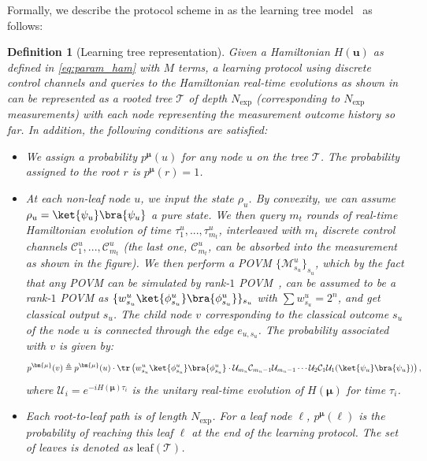 \documentclass[twocolumn,superscriptaddress,aps,showpacs,amsmath,amstex,amssymb,citeautoscript,floatfix,pra,preprintnumbers]{revtex4-2}
\theoremstyle{plain}
\theoremstyle{plain}
\theoremstyle{plain}
\theoremstyle{plain}
\theoremstyle{plain}
\theoremstyle{plain}
\newtheorem{defn}{Definition}
\begin{document}
\begin{appendix}
Formally, we describe the protocol scheme in  as the learning tree model~\cite{learningtree,OptimalTradeOff} as follows:
\begin{defn}[Learning tree representation] 
Given a Hamiltonian $H(\bm{u})$ as defined in \eqref{eq:param_ham} with $M$ terms, a learning protocol using discrete control channels and queries to the Hamiltonian real-time evolutions as shown in  can be represented as a rooted tree $\mathcal{T}$ of depth $N_{\exp}$ (corresponding to $N_{\exp}$ measurements) with each node representing the measurement outcome history so far. In addition, the following conditions are satisfied:
\begin{itemize}
    \item We assign a probability $p^{\bm{\mu}}(u)$ for any node $u$ on the tree $\mathcal{T}$. The probability assigned to the root $r$ is $p^{\bm{\mu}}(r)=1$.
    \item At each non-leaf node $u$, we input the state $\rho_u$. By convexity, we can assume $\rho_u=\ket{\psi_u}\bra{\psi_u}$ a pure state. We then query $m_t$ rounds of real-time Hamiltonian evolution of time $\tau^u_{1},...,\tau^u_{m_t}$, interleaved with $m_t$ discrete control channels $\mathcal{C}_1^{u},...,\mathcal{C}_{m_t}^u$ (the last one, $\mathcal{C}_{m_t}^u$, can be absorbed into the measurement as shown in the figure). We then perform a POVM $\{\mathcal{M}_{s_u}^u\}_{s_u}$, which by the fact that any POVM can be simulated by rank-$1$ POVM~\cite{learningtree}, can be assumed to be a rank-$1$ POVM as $\{w^u_{s_u}\ket{\phi_{s_u}^u}\bra{\phi_{s_u}^u}\}_{s_u}$ with $\sum w^u_{s_u}=2^n$, and get classical output $s_u$. The child node $v$ corresponding to the classical outcome $s_u$ of the node $u$ is connected through the edge $e_{u,s_u}$. The probability associated with $v$ is given by:
    \begin{align}
    p^{\bm{\mu}}(v)\triangleq p^{\bm{\mu}}(u)\cdot\tr\left(w^u_{s_u}\ket{\phi_{s_u}^u}\bra{\phi_{s_u}^u}\cdot \mathcal{U}_{m_u}\mathcal{C}_{m_u-1}\mathcal{U}_{m_u-1}\cdots \mathcal{U}_2\mathcal{C}_1 \mathcal{U}_1(\ket{\psi_u}\bra{\psi_u})\right),\label{app_eq:transition_prob}
    \end{align}
    where $\mathcal{U}_i=e^{-iH(\bm{\mu})\tau_{i}}$ is the unitary real-time evolution of $H(\bm{\mu})$ for time $\tau_i$.
    \item Each root-to-leaf path is of length $N_{\exp}$. For a leaf node $\ell$, $p^{\bm{\mu}}(\ell)$ is the probability of reaching this leaf $\ell$ at the end of the learning protocol. The set of leaves is denoted as $\text{leaf}(\mathcal{T})$.
\end{itemize}
\end{defn}


\end{appendix}
\end{document}
